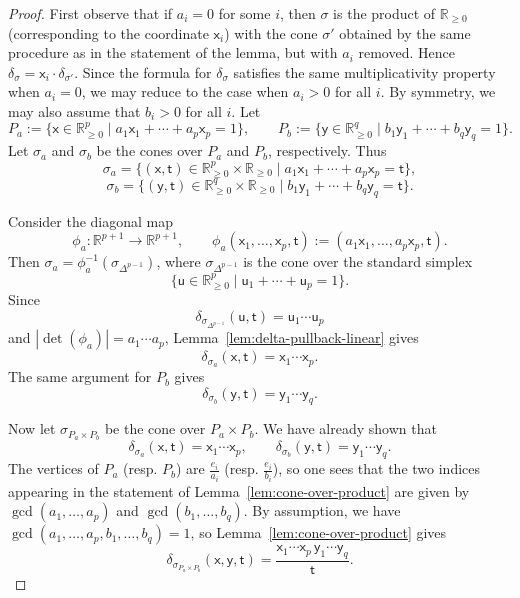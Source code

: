 \documentclass[11pt]{article}
\newcommand{\RR}{\mathbb{R}}
\theoremstyle{definition}
\begin{document}
\begin{proof}
	First observe that if $a_i=0$ for some $i$, then $\sigma$ is the product of $\mathbb{R}_{\ge 0}$ (corresponding to the coordinate $\mathsf{x}_i$)
	with the cone $\sigma'$ obtained by the same procedure as in the statement of the lemma, but with $a_i$ removed. Hence
	$\delta_{\sigma}=\mathsf{x}_i\cdot \delta_{\sigma'}$. Since the formula for $\delta_{\sigma}$ satisfies the same multiplicativity property
	when $a_i=0$, we may reduce to the case when $a_i>0$ for all $i$. By symmetry, we may also assume that $b_i>0$ for all $i$.
	Let
	\[
		P_a:=\{\mathsf{x}\in \RR_{\ge 0}^p\mid a_1\mathsf{x}_1+\cdots+a_p\mathsf{x}_p=1\},
		\qquad
		P_b:=\{\mathsf{y}\in \RR_{\ge 0}^q\mid b_1\mathsf{y}_1+\cdots+b_q\mathsf{y}_q=1\}.
	\]
	Let $\sigma_a$ and $\sigma_b$ be the cones over $P_a$ and $P_b$, respectively. Thus
	\[
		\sigma_a=\{(\mathsf{x},\mathsf{t})\in \RR_{\ge 0}^p\times \RR_{\ge 0}\mid a_1\mathsf{x}_1+\cdots+a_p\mathsf{x}_p=\mathsf{t}\},
	\]
	\[
		\sigma_b=\{(\mathsf{y},\mathsf{t})\in \RR_{\ge 0}^q\times \RR_{\ge 0}\mid b_1\mathsf{y}_1+\cdots+b_q\mathsf{y}_q=\mathsf{t}\}.
	\]

	Consider the diagonal map
	\[
		\phi_a:\RR^{p+1}\to \RR^{p+1},
		\qquad
		\phi_a(\mathsf{x}_1,\dots,\mathsf{x}_p,\mathsf{t}):=(a_1\mathsf{x}_1,\dots,a_p\mathsf{x}_p,\mathsf{t}).
	\]
	Then $\sigma_a=\phi_a^{-1}(\sigma_{\Delta^{p-1}})$, where $\sigma_{\Delta^{p-1}}$ is the cone over the standard simplex
	\[
		\{\mathsf{u}\in \RR_{\ge 0}^p\mid \mathsf{u}_1+\cdots+\mathsf{u}_p=1\}.
	\]
	Since
	\[
		\delta_{\sigma_{\Delta^{p-1}}}(\mathsf{u},\mathsf{t})=\mathsf{u}_1\cdots \mathsf{u}_p
	\]
	and $|\det(\phi_a)|=a_1\cdots a_p$, Lemma~\ref{lem:delta-pullback-linear} gives
	\[
		\delta_{\sigma_a}(\mathsf{x},\mathsf{t})=\mathsf{x}_1\cdots \mathsf{x}_p.
	\]
	The same argument for $P_b$ gives
	\[
		\delta_{\sigma_b}(\mathsf{y},\mathsf{t})=\mathsf{y}_1\cdots \mathsf{y}_q.
	\]

	Now let $\sigma_{P_a\times P_b}$ be the cone over $P_a\times P_b$. We have already shown that
	\[
		\delta_{\sigma_a}(\mathsf{x},\mathsf{t})=\mathsf{x}_1\cdots \mathsf{x}_p,
		\qquad
		\delta_{\sigma_b}(\mathsf{y},\mathsf{t})=\mathsf{y}_1\cdots \mathsf{y}_q.
	\]
	The vertices of $P_a$ (resp. $P_b$) are $\frac{e_i}{a_i}$ (resp. $\frac{e_i}{b_i}$), so
	one sees that the two indices appearing in the statement of Lemma~\ref{lem:cone-over-product}
	are given by $\gcd(a_1,\dots,a_p)$ and $\gcd(b_1,\dots,b_q)$. By assumption, we have
	$\gcd(a_1,\dots,a_p,b_1,\dots,b_q)=1$,
	so Lemma~\ref{lem:cone-over-product} gives
	\[
		\delta_{\sigma_{P_a\times P_b}}(\mathsf{x},\mathsf{y},\mathsf{t})
		=
		\frac{\mathsf{x}_1\cdots \mathsf{x}_p\,\mathsf{y}_1\cdots \mathsf{y}_q}{\mathsf{t}}.
	\]


\end{proof}
\end{document}
